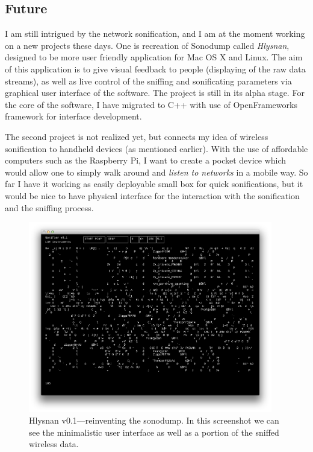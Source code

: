 \documentclass[12pt,a4paper,oneside]{report}
\begin{document}
\subsection{Future}
I am still intrigued by the network sonification, and I am at the moment working on a new projects these days. One is recreation of Sonodump called \textit{Hlysnan}, designed to be more user friendly application for Mac OS X and Linux. The aim of this application is to give visual feedback to people (displaying of the raw data streams), as well as live control of the sniffing and sonificating parameters via graphical user interface of the software. The project is still in its alpha stage. For the core of the software, I have migrated to C++ with use of OpenFrameworks framework for interface development.

The second project is not realized yet, but connects my idea of wireless sonification to handheld devices (as mentioned earlier). With the use of affordable computers such as the Raspberry Pi, I want to create a pocket device which would allow one to simply walk around and \emph{listen to networks} in a mobile way. So far I have it working as easily deployable small box for quick sonifications, but it would be nice to have physical interface for the interaction with the sonification and the sniffing process.

\begin{figure}  
  \centering
    \includegraphics[width=0.95\textwidth]{img/hlysnan}%
	\caption{Hlysnan v0.1---reinventing the sonodump. In this screenshot we can see the minimalistic user interface as well as a portion of the sniffed wireless data.}
	\label{fig:hlysnan}
\end{figure}
\end{document}
